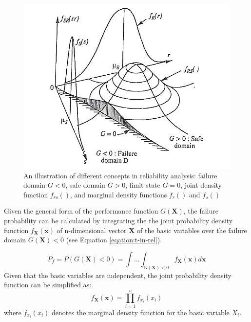 \begin{figure}[hbt!]
\centering
  \includegraphics[width=0.7\linewidth]{figures/fig-ch2/limit-state-violation.png}
  \caption{An illustration of different concepts in reliability analysis: failure domain $G<0$, safe domain $G>0$, limit state $G=0$, joint density function $f_{rs}()$, 
  and marginal density functions $f_r()$ and $f_s()$}
  \label{fig:fail-domain}
\end{figure}

Given the general form of the performance function $G(\textbf{X})$, the failure probability can be calculated by integrating the the joint probability density function 
$f_{\textbf{X}}(\textbf{x})$ of n-dimensional vector $\textbf{X}$ of the basic variables over the failure domain $G(\textbf{X})<0$ (see Equation \ref{eqation:t-in-rel}). 

\begin{equation}
P_f = P(G(\textbf{X})<0) = \int ... \int_{G(\textbf{X})<0}f_{\textbf{X}}(\textbf{x})d\textbf{x}
\label{eqation:t-in-rel}
\end{equation}
\noindent
Given that the basic variables are independent, the joint probability density function can be simplified as: 
\begin{equation}
f_{\textbf{X}}(\textbf{x})= \prod_{i=1}^{n}f_{x_i}(x_i)
\label{eqation:density}
\end{equation}
where $f_{x_i}(x_i)$ denotes the marginal density function for the basic variable $X_i$. 



